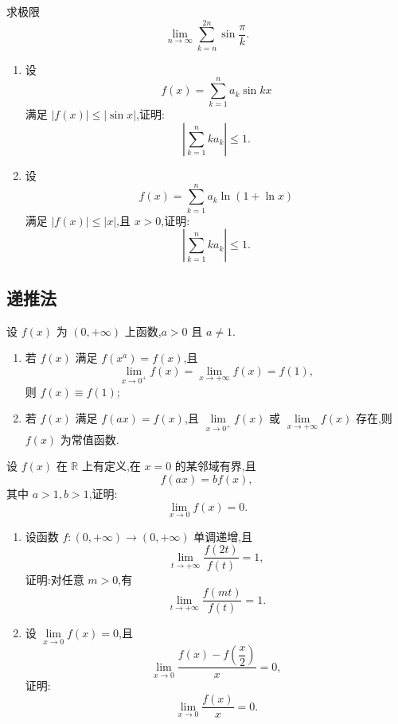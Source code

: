 \documentclass[../数学分析培优讲义.tex]{subfiles}
\begin{document}
\begin{example}
求极限
\[
    \lim\limits_{n\to\infty}
    \sum\limits_{k=n}^{2n}\sin\dfrac{\pi}{k}.
\]
\end{example}
\exampleblank

\begin{example}
\begin{enumerate}[label=(\arabic*)]
    \item 设
    \[
        f(x)=\sum\limits_{k=1}^n a_k\sin kx
    \]
    满足 $|f(x)|\leq|\sin x|$,证明:
    \[
        \left|\sum\limits_{k=1}^n ka_k\right|\leq1.
    \]
    \item 设
    \[
        f(x)=\sum\limits_{k=1}^n a_k\ln(1+\ln x)
    \]
    满足 $|f(x)|\leq|x|$,且 $x>0$,证明:
    \[
        \left|\sum\limits_{k=1}^n ka_k\right|\leq1.
    \]
\end{enumerate}
\end{example}
\exampleblank


\newpage

\subsection{递推法}

\begin{example}
设 $f(x)$ 为 $(0,+\infty)$ 上函数,$a>0$ 且 $a\neq1$.
\begin{enumerate}[label=(\arabic*)]
    \item 若 $f(x)$ 满足 $f(x^a)=f(x)$,且
    \[
        \lim\limits_{x\to0^+}f(x)
        =\lim\limits_{x\to+\infty}f(x)
        =f(1),
    \]
    则 $f(x)\equiv f(1)$;
    \item 若 $f(x)$ 满足 $f(ax)=f(x)$,且
    $\displaystyle\lim\limits_{x\to0^+}f(x)$ 或
    $\displaystyle\lim\limits_{x\to+\infty}f(x)$ 存在,则 $f(x)$ 为常值函数.
\end{enumerate}
\end{example}
\exampleblank

\begin{example}
设 $f(x)$ 在 $\mathbb{R}$ 上有定义,在 $x=0$ 的某邻域有界,且
\[
    f(ax)=bf(x),
\]
其中 $a>1,b>1$,证明:
\[
    \lim\limits_{x\to0}f(x)=0.
\]
\end{example}
\exampleblank

\begin{example}
\begin{enumerate}[label=(\arabic*)]
    \item 设函数 $f:(0,+\infty)\to(0,+\infty)$ 单调递增,且
    \[
        \lim\limits_{t\to+\infty}\dfrac{f(2t)}{f(t)}=1,
    \]
    证明:对任意 $m>0$,有
    \[
        \lim\limits_{t\to+\infty}\dfrac{f(mt)}{f(t)}=1.
    \]
    \item 设 $\displaystyle\lim\limits_{x\to0}f(x)=0$,且
    \[
        \lim\limits_{x\to0}\dfrac{f(x)-f\left(\dfrac{x}{2}\right)}{x}=0,
    \]
    证明:
    \[
        \lim\limits_{x\to0}\dfrac{f(x)}{x}=0.
    \]
\end{enumerate}
\end{example}
\exampleblank
\end{document}
